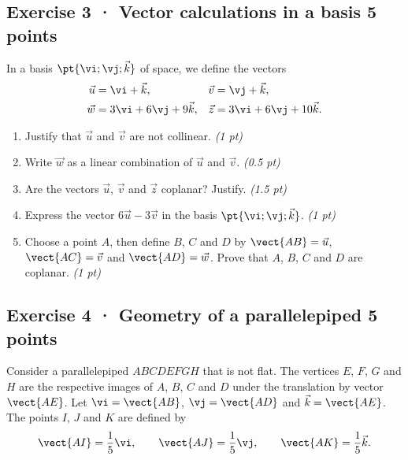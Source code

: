 \mxnewpage{}

\subsection*{Exercise 3 · Vector calculations in a basis \hfill 5 points}In a basis $\pt{\vi;\vj;\vec k}$ of space, we define the vectors
\[\begin{aligned}\vec u&=\vi+\vec k,&\vec v&=\vj+\vec k,\\
\vec w&=3\vi+6\vj+9\vec k,&\vec z&=3\vi+6\vj+10\vec k.\end{aligned}\]

\begin{enumerate}

\item Justify that $\vec u$ and $\vec v$ are not collinear. \hfill\textit{(1 pt)}

\item Write $\vec w$ as a linear combination of $\vec u$ and $\vec v$. \hfill\textit{(0.5 pt)}

\item Are the vectors $\vec u$, $\vec v$ and $\vec z$ coplanar? Justify. \hfill\textit{(1.5 pt)}

\item Express the vector $6\vec u-3\vec v$ in the basis $\pt{\vi;\vj;\vec k}$. \hfill\textit{(1 pt)}

\item Choose a point $A$, then define $B$, $C$ and $D$ by $\vect{AB}=\vec u$, $\vect{AC}=\vec v$ and $\vect{AD}=\vec w$. Prove that $A$, $B$, $C$ and $D$ are coplanar. \hfill\textit{(1 pt)}

\end{enumerate}

\subsection*{Exercise 4 · Geometry of a parallelepiped \hfill 5 points}Consider a parallelepiped $ABCDEFGH$ that is not flat. The vertices $E$, $F$, $G$ and $H$ are the respective images of $A$, $B$, $C$ and $D$ under the translation by vector $\vect{AE}$.
Let $\vi=\vect{AB}$, $\vj=\vect{AD}$ and $\vec k=\vect{AE}$.
The points $I$, $J$ and $K$ are defined by
\[\vect{AI}=\frac1{5}\vi,\qquad\vect{AJ}=\frac1{5}\vj,\qquad\vect{AK}=\frac1{5}\vec k.\]

